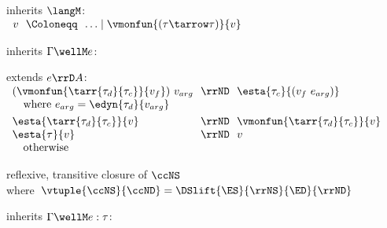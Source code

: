 \begin{flushleft}

\begin{minipage}[t]{\columnwidth}
 inherits $\langM$:\\
$\begin{array}{l@{~~}c@{~~}l}
  v & \Coloneqq & \ldots \mid \vmonfun{(\tau\tarrow\tau)}{v}
\end{array}$

\medskip
{} inherits $\Gamma \wellM e$:\\
\begin{mathpar}
\end{mathpar}

\medskip
{} extends $e \rrD A$:\\
$\begin{array}{l@{~~}c@{~~}l}
  (\vmonfun{\tarr{\tau_d}{\tau_c}}{v_f})~v_{arg} & \rrND & \esta{\tau_c}{(v_f~e_{arg})}
\\ \multicolumn{3}{l}{\mbox{\quad where $e_{arg} = \edyn{\tau_d}{v_{arg}}$}}
\\[0.8ex]
  \esta{\tarr{\tau_d}{\tau_c}}{v} & \rrND & \vmonfun{\tarr{\tau_d}{\tau_c}}{v}
\\
  \esta{\tau}{v} & \rrND & v
\\ \multicolumn{3}{l}{\mbox{\quad otherwise}}
\end{array}$

\medskip
{} reflexive, transitive closure of $\ccNS$\\
\mbox{\quad where $\vtuple{\ccNS}{\ccND} = \DSlift{\ES}{\rrNS}{\ED}{\rrND}$}
\smallskip
\end{minipage}%
\begin{minipage}[t]{\columnwidth}
 inherits $\Gamma \wellM e : \tau$:
\begin{mathpar}
\end{mathpar}


\end{minipage}
\end{flushleft}
